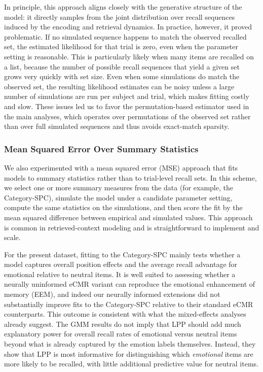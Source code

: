 \documentclass[
  letterpaper,
  DIV=11,
  numbers=noendperiod]{scrartcl}
\begin{document}
In principle, this approach aligns closely with the generative structure
of the model: it directly samples from the joint distribution over
recall sequences induced by the encoding and retrieval dynamics. In
practice, however, it proved problematic. If no simulated sequence
happens to match the observed recalled set, the estimated likelihood for
that trial is zero, even when the parameter setting is reasonable. This
is particularly likely when many items are recalled on a list, because
the number of possible recall sequences that yield a given set grows
very quickly with set size. Even when some simulations do match the
observed set, the resulting likelihood estimates can be noisy unless a
large number of simulations are run per subject and trial, which makes
fitting costly and slow. These issues led us to favor the
permutation-based estimator used in the main analyses, which operates
over permutations of the observed set rather than over full simulated
sequences and thus avoids exact-match sparsity.

\subsubsection{Mean Squared Error Over Summary
Statistics}\label{mean-squared-error-over-summary-statistics}

We also experimented with a mean squared error (MSE) approach that fits
models to summary statistics rather than to trial-level recall sets. In
this scheme, we select one or more summary measures from the data (for
example, the Category-SPC), simulate the model under a candidate
parameter setting, compute the same statistics on the simulations, and
then score the fit by the mean squared difference between empirical and
simulated values. This approach is common in retrieved-context modeling
and is straightforward to implement and scale.

For the present dataset, fitting to the Category-SPC mainly tests
whether a model captures overall position effects and the average recall
advantage for emotional relative to neutral items. It is well suited to
assessing whether a neurally uninformed eCMR variant can reproduce the
emotional enhancement of memory (EEM), and indeed our neurally informed
extensions did not substantially improve fits to the Category-SPC
relative to their standard eCMR counterparts. This outcome is consistent
with what the mixed-effects analyses already suggest. The GMM results do
not imply that LPP should add much explanatory power for overall recall
rates of emotional versus neutral items beyond what is already captured
by the emotion labels themselves. Instead, they show that LPP is most
informative for distinguishing which \emph{emotional} items are more
likely to be recalled, with little additional predictive value for
neutral items.
\end{document}
